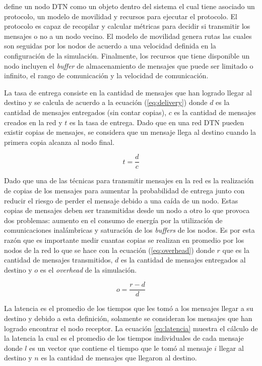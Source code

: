 \theone{} define un nodo DTN como un objeto dentro del sistema el cual tiene
asociado un protocolo, un modelo de movilidad y recursos para ejecutar el
protocolo. El protocolo es capaz de recopilar y calcular métricas para  decidir
si transmitir los mensajes o no a un nodo vecino.  El modelo de movilidad genera
rutas las cuales son seguidas por los nodos de acuerdo a una velocidad definida
en la configuración de la simulación.  Finalmente, los recursos que tiene
disponible un nodo incluyen el \textit{buffer} de almacenamiento de mensajes que
puede ser limitado o infinito, el rango de comunicación y la velocidad de
comunicación.

La tasa de entrega consiste en la cantidad de mensajes que han logrado llegar al
destino y se calcula de acuerdo a la ecuación (\ref{eq:delivery}) donde $d$ es la
cantidad de mensajes entregados (sin contar copias), $c$ es la cantidad de
mensajes creados en la red y $t$ es la tasa de entrega. Dado que en una red DTN
pueden existir copias de mensajes, se considera que un mensaje llega al destino
cuando la primera copia alcanza al nodo final.


\begin{equation}
    \label{eq:delivery}
    t = \frac{d}{c}
\end{equation}

Dado que una de las técnicas para transmitir mensajes en la red es la
realización de copias de los mensajes para aumentar la probabilidad de entrega
junto con reducir el riesgo de perder el mensaje debido a una caída de un nodo.
Estas copias de mensajes deben ser transmitidas desde un nodo a otro lo que
provoca dos problemas: aumento en el consumo de energía por la utilización de
comunicaciones inalámbricas y saturación de los \textit{buffers} de los nodos.
Es por esta razón que es importante medir cuantas copias se realizan en promedio
por los nodos de la red lo que se hace con la ecuación (\ref{eq:overhead}) donde
$r$ que es la cantidad de mensajes transmitidos, $d$ es la cantidad de mensajes
entregados al destino y $o$ es el \textit{overhead} de la simulación.


\begin{equation}
    \label{eq:overhead}
    o = \frac{r - d}{d}
\end{equation}


La latencia es el promedio de los tiempos que les tomó a los mensajes llegar a
su destino y debido a esta definición, solamente se consideran los mensajes que
han logrado encontrar el nodo receptor. La ecuación \eqref{eq:latencia} muestra
el cálculo de la latencia la cual es el promedio de los tiempos individuales de
cada mensaje donde $l$ es un vector que contiene el tiempo que le tomó al
mensaje $i$ llegar al destino y $n$ es la cantidad de mensajes que llegaron al
destino.


